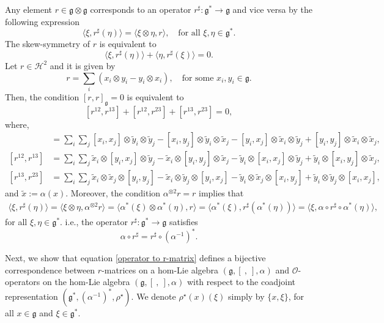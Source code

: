 \documentclass[a4paper,11pt]{amsart}
\theoremstyle{plain}
\theoremstyle{definition}
\theoremstyle{remark}
\numberwithin{equation}{section}
\begin{document}
Any element $r\in \mathfrak{g}\otimes \mathfrak{g}$ corresponds to an operator $r^{\sharp}:\mathfrak{g}^*\rightarrow \mathfrak{g}$ and vice versa by the following expression
\begin{equation}\label{operator to r-matrix}
\langle\xi,r^{\sharp}(\eta)\rangle=\langle\xi\otimes \eta, r\rangle,\quad \mbox{for all }\xi,\eta\in \mathfrak{g}^*.
\end{equation}
The skew-symmetry of $r$ is equivalent to 
$$\langle\xi,r^{\sharp}(\eta)\rangle+\langle\eta,r^{\sharp}(\xi)\rangle=0.$$
Let $r\in \mathcal{H}^2$ and it is given by
\begin{equation}\label{def of r-matrix}
r=\sum_i(x_i\otimes y_i- y_i\otimes x_i),\quad\mbox{for some }x_i,y_i\in \mathfrak{g}.
\end{equation}
Then, the condition $[r,r]_{\mathfrak{g}}=0$ is equivalent to
$$[r^{12},r^{13}]+[r^{12},r^{23}]+[r^{13},r^{23}]=0,$$
where, 
\begin{align*}
[r^{12},r^{13}]&=\sum_i\sum_j[x_i,x_j]\otimes \tilde{y}_i\otimes\tilde{y}_j-[x_i,y_j]\otimes \tilde{y}_i\otimes\tilde{x}_j-[y_i,x_j]\otimes \tilde{x}_i\otimes\tilde{y}_j+[y_i,y_j]\otimes \tilde{x}_i\otimes\tilde{x}_j,\\
[r^{12},r^{13}]&=\sum_i\sum_j\tilde{x}_i\otimes[y_i,x_j]\otimes \tilde{y}_j-\tilde{x}_i\otimes[y_i,y_j]\otimes \tilde{x}_j-\tilde{y}_i\otimes[x_i,x_j]\otimes \tilde{y}_j+\tilde{y}_i\otimes[x_i,y_j]\otimes \tilde{x}_j,\\
[r^{13},r^{23}]&=\sum_i\sum_j\tilde{x}_i\otimes\tilde{x}_j\otimes [y_i,y_j]-\tilde{x}_i\otimes\tilde{y}_j\otimes [y_i,x_j]-\tilde{y}_i\otimes\tilde{x}_j\otimes[x_i,y_j] +\tilde{y}_i\otimes\tilde{y}_j\otimes [x_i,x_j],
\end{align*}
and $\tilde{x}:=\alpha(x)$. Moreover, the condition $\alpha^{\otimes 2}r=r$ implies that
\begin{align*}
\langle\xi,r^{\sharp}(\eta)\rangle=\langle\xi\otimes \eta, \alpha^{\otimes 2}r\rangle
=\langle\alpha^*(\xi)\otimes \alpha^*(\eta), r\rangle=\langle\alpha^*(\xi), r^{\sharp}(\alpha^*(\eta))\rangle=\langle\xi, \alpha\circ r^{\sharp}\circ\alpha^*(\eta)\rangle,
\end{align*}
for all $\xi,\eta\in \mathfrak{g}^*$. i.e., the operator $r^{\sharp}:\mathfrak{g}^*\rightarrow \mathfrak{g}$ satisfies 
\begin{equation}\label{cond1 for corresp}
\alpha\circ r^{\sharp}=r^{\sharp}\circ (\alpha^{-1})^*.
\end{equation} 

Next, we show that equation \eqref{operator to r-matrix} defines a bijective correspondence between $r$-matrices on a hom-Lie algebra $(\mathfrak{g},[~,~],\alpha)$  and  $\mathcal{O}$-operators on the hom-Lie algebra $(\mathfrak{g},[~,~],\alpha)$ with respect to the coadjoint representation $(\mathfrak{g}^*,(\alpha^{-1})^*,\rho^\star)$. We denote $\rho^\star(x)(\xi)$ simply by $\{x,\xi\}$, for all $x\in\mathfrak{g}$ and $\xi\in\mathfrak{g}^*$. 
\end{document}
